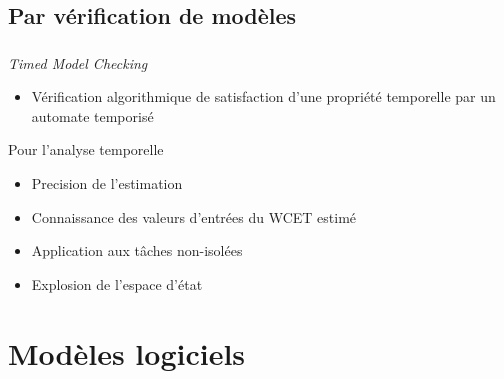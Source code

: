 \documentclass{beamer}
\begin{document}
    \subsection{Par vérification de modèles}
      \begin{frame}\small
        \frametitle{\secname}
        \framesubtitle{\subsecname}

        \begin{block}{\textit{Timed Model Checking}}
          \begin{itemize}
            \item Vérification algorithmique de satisfaction d'une propriété
              temporelle par un automate temporisé
          \end{itemize}
        \end{block}

        \pause
        \begin{block}{Pour l'analyse temporelle}
          \begin{itemize}
            \item Precision de l'estimation
            \item Connaissance des valeurs d'entrées du WCET estimé
            \item Application aux tâches non-isolées
            \pause
            \item Explosion de l'espace d'état
          \end{itemize}
        \end{block}
      \end{frame}


  \section{Modèles logiciels}
\end{document}
